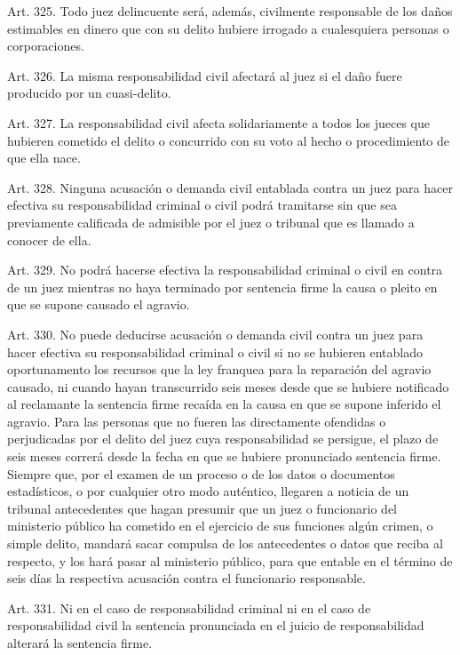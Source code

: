     Art. 325. Todo juez delincuente será, además, civilmente responsable de los daños estimables en dinero que con su delito hubiere irrogado a cualesquiera personas o corporaciones.

    Art. 326. La misma responsabilidad civil afectará al juez si el daño fuere producido por un cuasi-delito.




    Art. 327. La responsabilidad civil afecta solidariamente a todos los jueces que hubieren cometido el delito o concurrido con su voto al hecho o procedimiento de que ella nace.

    Art. 328. Ninguna acusación o demanda civil entablada contra un juez para hacer efectiva su responsabilidad criminal o civil podrá tramitarse sin que sea previamente calificada de admisible por el juez o tribunal que es llamado a conocer de ella.


    Art. 329. No podrá hacerse efectiva la responsabilidad criminal o civil en contra de un juez mientras no haya terminado por sentencia firme la causa o pleito en que se supone causado el agravio.

    Art. 330. No puede deducirse acusación o demanda civil contra un juez para hacer efectiva su responsabilidad criminal o civil si no se hubieren entablado oportunamento los recursos que la ley franquea para la reparación del agravio causado, ni cuando hayan transcurrido seis meses desde que se hubiere notificado al reclamante la sentencia firme recaída en la causa en que se supone inferido el agravio.
    Para las personas que no fueren las directamente ofendidas o perjudicadas por el delito del juez cuya responsabilidad se persigue, el plazo de seis meses correrá desde la fecha en que se hubiere pronunciado sentencia firme.
    Siempre que, por el examen de un proceso o de los datos o documentos estadísticos, o por cualquier otro modo auténtico, llegaren a noticia de un tribunal antecedentes que hagan presumir que un juez o funcionario del ministerio público ha cometido en el ejercicio de sus funciones algún crimen, o simple delito, mandará sacar compulsa de los antecedentes o datos que reciba al respecto, y los hará pasar al ministerio público, para que entable en el término de seis días la respectiva acusación contra el funcionario responsable.


    Art. 331. Ni en el caso de responsabilidad criminal ni en el caso de responsabilidad civil la sentencia pronunciada en el juicio de responsabilidad alterará la sentencia firme.

